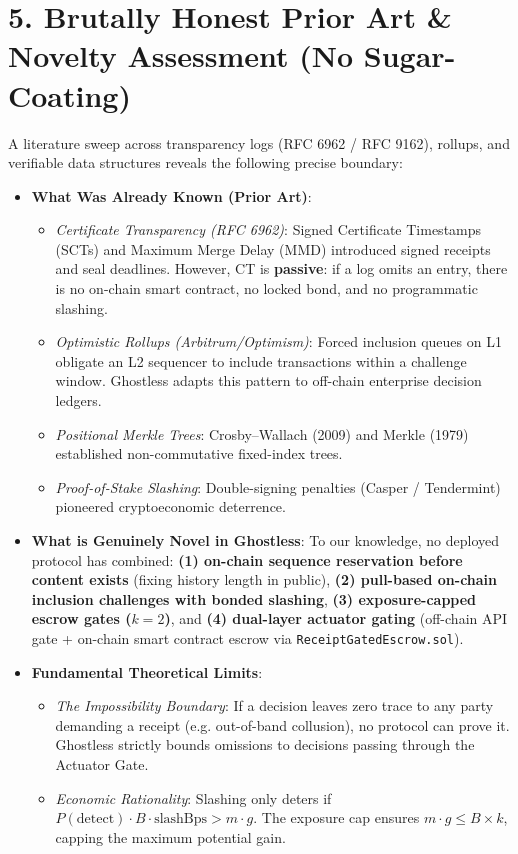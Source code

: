 \documentclass[11pt,a4paper]{article}
\begin{document}
\section{5. Brutally Honest Prior Art \& Novelty Assessment (No Sugar-Coating)}

A literature sweep across transparency logs (RFC 6962 / RFC 9162), rollups, and verifiable data structures reveals the following precise boundary:

\begin{itemize}[leftmargin=1.5em]
    \item \textbf{What Was Already Known (Prior Art)}:
    \begin{itemize}
        \item \textit{Certificate Transparency (RFC 6962)}: Signed Certificate Timestamps (SCTs) and Maximum Merge Delay (MMD) introduced signed receipts and seal deadlines. However, CT is \textbf{passive}: if a log omits an entry, there is no on-chain smart contract, no locked bond, and no programmatic slashing.
        \item \textit{Optimistic Rollups (Arbitrum/Optimism)}: Forced inclusion queues on L1 obligate an L2 sequencer to include transactions within a challenge window. Ghostless adapts this pattern to off-chain enterprise decision ledgers.
        \item \textit{Positional Merkle Trees}: Crosby--Wallach (2009) and Merkle (1979) established non-commutative fixed-index trees.
        \item \textit{Proof-of-Stake Slashing}: Double-signing penalties (Casper / Tendermint) pioneered cryptoeconomic deterrence.
    \end{itemize}
    \item \textbf{What is Genuinely Novel in Ghostless}:
    To our knowledge, no deployed protocol has combined: \textbf{(1) on-chain sequence reservation before content exists} (fixing history length in public), \textbf{(2) pull-based on-chain inclusion challenges with bonded slashing}, \textbf{(3) exposure-capped escrow gates ($k=2$)}, and \textbf{(4) dual-layer actuator gating} (off-chain API gate + on-chain smart contract escrow via \texttt{ReceiptGatedEscrow.sol}).
    \item \textbf{Fundamental Theoretical Limits}:
    \begin{itemize}
        \item \textit{The Impossibility Boundary}: If a decision leaves zero trace to any party demanding a receipt (e.g. out-of-band collusion), no protocol can prove it. Ghostless strictly bounds omissions to decisions passing through the Actuator Gate.
        \item \textit{Economic Rationality}: Slashing only deters if $P(\text{detect}) \cdot B \cdot \text{slashBps} > m \cdot g$. The exposure cap ensures $m \cdot g \le B \times k$, capping the maximum potential gain.
    \end{itemize}
\end{itemize}
\end{document}
